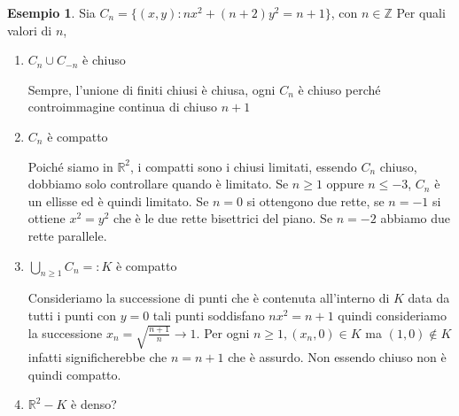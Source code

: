 \documentclass{article}
\newcounter{theo}[section]\setcounter{theo}{0}
\newcounter{excounter}[section]\setcounter{excounter}{0}
\theoremstyle{plain}
\theoremstyle{definition}
\newtheorem{example}[excounter]{Esempio}
\theoremstyle{remark}
\begin{document}
\begin{example}
    Sia \(C_n = \{ (x, y) : nx^2 + (n+2)y^2 = n+1\} \), con \(n \in \mathbb{Z}\) 
    Per quali valori di \(n\),
\begin{enumerate}[label = \arabic*.]
    \item \(C_n \cup C_{-n}\) è chiuso

        Sempre, l'unione di finiti chiusi è chiusa, ogni \(C_n\) è chiuso
        perché controimmagine continua di chiuso \(n+1\) 
    \item \(C_n\) è compatto

        Poiché siamo in \(\mathbb{R}^{2}\), i compatti sono i chiusi limitati,
        essendo \(C_n\) chiuso, dobbiamo solo controllare quando è limitato. Se
        \(n \ge 1\) oppure \(n \le -3\), \(C_n\) è un ellisse ed è quindi limitato.
        Se \(n = 0\) si ottengono due rette, se \(n = -1\) si ottiene \(x^2 =
        y^2 \) che è le due rette bisettrici del piano. Se \(n = -2\) abbiamo due
        rette parallele.

    \item \(\bigcup_{n \ge 1} C_n =: K\) è compatto

        Consideriamo la successione di punti che è contenuta all'interno di
        \(K\) data da tutti i punti con \(y=0\) tali punti soddisfano \(nx^2 =
        n+1\) quindi consideriamo la successione \(x_n = \sqrt{\frac{n+1}{n}}
        \to 1\). Per ogni \(n \ge 1, (x_{n}, 0) \in K \)  ma \((1, 0) \not\in
        K\) infatti significherebbe che \(n = n+1\) che è assurdo. Non essendo
        chiuso non è quindi compatto.
    \item \(\mathbb{R}^2 - K\) è denso?
\end{enumerate}
\end{example}
\end{document}
